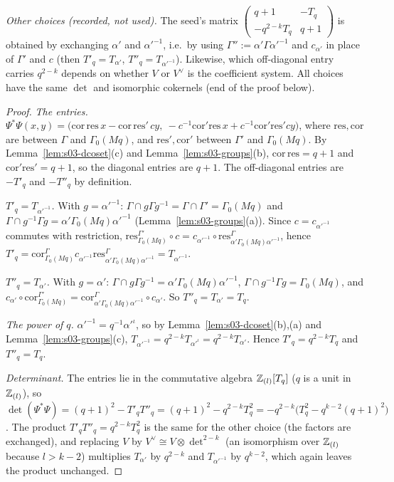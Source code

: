 \noindent\emph{Other choices (recorded, not used).} The seed's matrix $\left(\begin{smallmatrix}q+1&-T_q\\-q^{2-k}T_q&q+1\end{smallmatrix}\right)$ is obtained by
exchanging $\alpha'$ and $\alpha'^{-1}$, i.e.\ by using $\Gamma'':=\alpha'\Gamma\alpha'^{-1}$ and $c_{\alpha'}$ in place of $\Gamma'$ and $c$ (then $T'_q=T_{\alpha'}$,
$T''_q=T_{\alpha'^{-1}}$). Likewise, which off-diagonal entry carries $q^{2-k}$ depends on whether $V$ or $V^\vee$ is the coefficient system. All choices
have the same $\det$ and isomorphic cokernels (end of the proof below).

\begin{proof}
\emph{The entries.} $\Psi^*\Psi(x,y)=\big(\mathrm{cor}\,\mathrm{res}\,x-\mathrm{cor}\,\mathrm{res}'\,cy,\ -c^{-1}\mathrm{cor}'\mathrm{res}\,x+c^{-1}\mathrm{cor}'\mathrm{res}'cy\big)$, where
$\mathrm{res},\mathrm{cor}$ are between $\Gamma$ and $\Gamma_0(Mq)$, and $\mathrm{res}',\mathrm{cor}'$ between $\Gamma'$ and $\Gamma_0(Mq)$. By Lemma~\ref{lem:s03-dcoset}(c) and
Lemma~\ref{lem:s03-groups}(b), $\mathrm{cor}\,\mathrm{res}=q+1$ and $\mathrm{cor}'\mathrm{res}'=q+1$, so the diagonal entries are $q+1$. The off-diagonal entries are
$-T'_q$ and $-T''_q$ by definition.

\emph{$T'_q=T_{\alpha'^{-1}}$.} With $g=\alpha'^{-1}$: $\Gamma\cap g\Gamma g^{-1}=\Gamma\cap\Gamma'=\Gamma_0(Mq)$ and $\Gamma\cap g^{-1}\Gamma g=\alpha'\Gamma_0(Mq)\alpha'^{-1}$
(Lemma~\ref{lem:s03-groups}(a)). Since $c=c_{\alpha'^{-1}}$ commutes with restriction,
$\mathrm{res}^{\Gamma'}_{\Gamma_0(Mq)}\circ c=c_{\alpha'^{-1}}\circ\mathrm{res}^\Gamma_{\alpha'\Gamma_0(Mq)\alpha'^{-1}}$, hence $T'_q=\mathrm{cor}^\Gamma_{\Gamma_0(Mq)}c_{\alpha'^{-1}}\mathrm{res}^\Gamma_{\alpha'\Gamma_0(Mq)\alpha'^{-1}}=T_{\alpha'^{-1}}$.

\emph{$T''_q=T_{\alpha'}$.} With $g=\alpha'$: $\Gamma\cap g\Gamma g^{-1}=\alpha'\Gamma_0(Mq)\alpha'^{-1}$, $\Gamma\cap g^{-1}\Gamma g=\Gamma_0(Mq)$, and
$c_{\alpha'}\circ\mathrm{cor}^{\Gamma'}_{\Gamma_0(Mq)}=\mathrm{cor}^{\Gamma}_{\alpha'\Gamma_0(Mq)\alpha'^{-1}}\circ c_{\alpha'}$. So $T''_q=T_{\alpha'}=T_q$.

\emph{The power of $q$.} $\alpha'^{-1}=q^{-1}\alpha'^\iota$, so by Lemma~\ref{lem:s03-dcoset}(b),(a) and Lemma~\ref{lem:s03-groups}(c),
$T_{\alpha'^{-1}}=q^{2-k}T_{\alpha'^\iota}=q^{2-k}T_{\alpha'}$. Hence $T'_q=q^{2-k}T_q$ and $T''_q=T_q$.

\emph{Determinant.} The entries lie in the commutative algebra $\mathbb{Z}_{(l)}[T_q]$ ($q$ is a unit in $\mathbb{Z}_{(l)}$), so
$\det(\Psi^*\Psi)=(q+1)^2-T'_qT''_q=(q+1)^2-q^{2-k}T_q^2=-q^{2-k}\big(T_q^2-q^{k-2}(q+1)^2\big)$. The product $T'_qT''_q=q^{2-k}T_q^2$ is the same for the other choice
(the factors are exchanged), and replacing $V$ by $V^\vee\cong V\otimes{\det}^{2-k}$ (an isomorphism over $\mathbb{Z}_{(l)}$ because $l>k-2$) multiplies $T_{\alpha'}$ by $q^{2-k}$
and $T_{\alpha'^{-1}}$ by $q^{k-2}$, which again leaves the product unchanged.


\end{proof}
